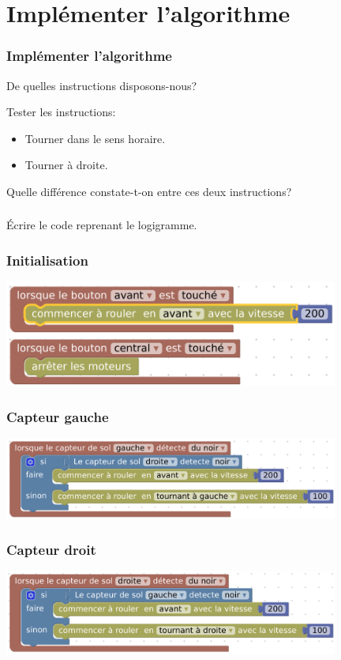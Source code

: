 \documentclass[svgnames,11pt]{beamer}
\begin{document}
\section{Implémenter l'algorithme}
\begin{frame}
    \frametitle{Implémenter l'algorithme}
\begin{aretenir}[Question]
De quelles instructions disposons-nous?
\end{aretenir}
\begin{activite}
Tester les instructions:
\begin{itemize}
    \item Tourner dans le sens horaire.
    \item Tourner à droite.
\end{itemize}
Quelle différence constate-t-on entre ces deux instructions?
\end{activite}

\end{frame}
\begin{frame}
    \frametitle{}

    \begin{aretenir}[Question]
    Écrire le code reprenant le logigramme.
    \end{aretenir}
\end{frame}
\begin{frame}
    \frametitle{Initialisation}

    \begin{center}
    \centering
    \includegraphics[width=11cm]{ressources/init.png}
    \end{center}

\end{frame}
\begin{frame}
    \frametitle{Capteur gauche}

    \begin{center}
    \centering
    \includegraphics[width=11cm]{ressources/gauche.png}
    \end{center}

\end{frame}
\begin{frame}
    \frametitle{Capteur droit}

    \begin{center}
    \centering
    \includegraphics[width=11cm]{ressources/droite.png}
    \end{center}

\end{frame}
\end{document}
